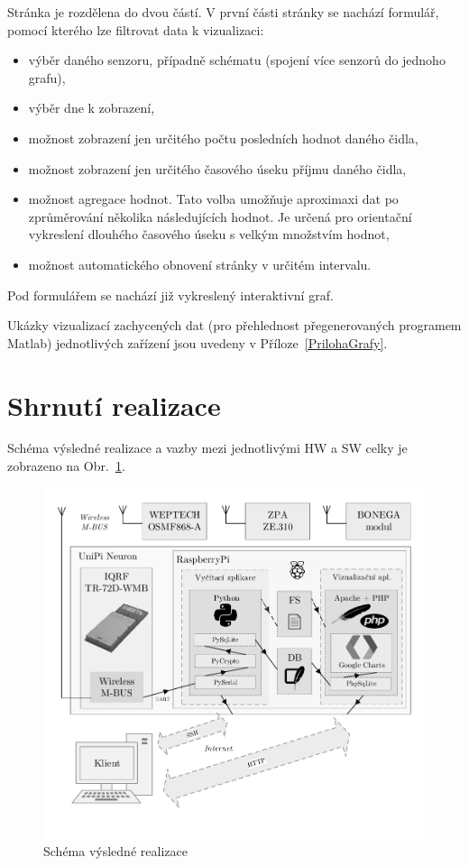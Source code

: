Stránka je rozdělena do dvou částí. V první části stránky se nachází formulář, pomocí kterého lze filtrovat data k vizualizaci:
\begin{itemize}
	\item výběr daného senzoru, případně schématu (spojení více senzorů do jednoho grafu),
	\item výběr dne k zobrazení,
	\item možnost zobrazení jen určitého počtu posledních hodnot daného čidla,
	\item možnost zobrazení jen určitého časového úseku příjmu daného čidla,
	\item možnost agregace hodnot. Tato volba umožňuje aproximaxi dat po zprůměrování několika následujících hodnot. Je určená pro orientační vykreslení dlouhého časového úseku s velkým množstvím hodnot,
	\item možnost automatického obnovení stránky v určitém intervalu.
\end{itemize}
 
Pod formulářem se nachází již vykreslený interaktivní graf.

Ukázky vizualizací zachycených dat (pro přehlednost přegenerovaných programem Matlab) jednotlivých zařízení jsou uvedeny v Příloze~\ref{PrilohaGrafy}.

\section{Shrnutí realizace}
Schéma výsledné realizace a vazby mezi jednotlivými HW a SW celky je zobrazeno na Obr.~\ref{SchemaFinal}.
\begin{figure}[!ht]
	\vspace{-10pt}
  \begin{center}
    \includegraphics[scale=0.75]{obrazky/aplikace_schema}
  \end{center}
	\vspace{-50pt}
  \caption{Schéma výsledné realizace}
	\label{SchemaFinal}
	\vspace{-5pt}
\end{figure}



